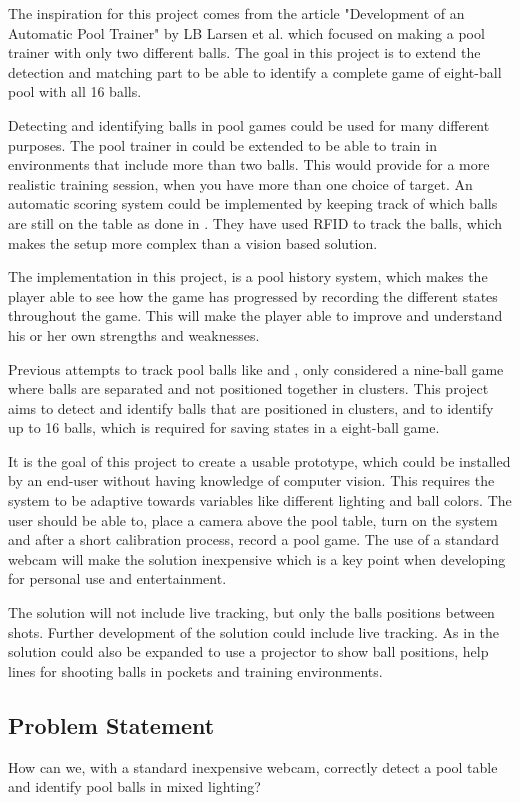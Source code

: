 The inspiration for this project comes from the article "Development of an Automatic Pool Trainer"\cite{larsbopool} by LB Larsen et al. which focused on making a pool trainer with only two different balls. The goal in this project is to extend the detection and matching part to be able to identify a complete game of eight-ball pool with all 16 balls.

Detecting and identifying balls in pool games could be used for many different purposes. The pool trainer in \cite{larsbopool} could be extended to be able to train in environments that include more than two balls. This would provide for a more realistic training session, when you have more than one choice of target. An automatic scoring system could be implemented by keeping track of which balls are still on the table as done in \cite{autoscore}. They have used RFID to track the balls, which makes the setup more complex than a vision based solution.

The implementation in this project, is a pool history system, which makes the player able to see how the game has progressed by recording the different states throughout the game. This will make the player able to improve and understand his or her own strengths and weaknesses.

Previous attempts to track pool balls like \cite{supportBilliard} and \cite{ARPool}, only considered a nine-ball game where balls are separated and not positioned together in clusters. This project aims to detect and identify balls that are positioned in clusters, and to identify up to 16 balls, which is required for saving states in a eight-ball game.

It is the goal of this project to create a usable prototype, which could be installed by an end-user without having knowledge of computer vision. This requires the system to be adaptive towards variables like different lighting and ball colors. The user should be able to, place a camera above the pool table, turn on the system and after a short calibration process, record a pool game. The use of a standard webcam will make the solution inexpensive which is a key point when developing for personal use and entertainment.

The solution will not include live tracking, but only the balls positions between shots. Further development of the solution could include live tracking. As in \cite{larsbopool} the solution could also be expanded to use a projector to show ball positions, help lines for shooting balls in pockets and training environments. 

\subsection{Problem Statement}
How can we, with a standard inexpensive webcam, correctly detect a pool table and identify pool balls in mixed lighting?